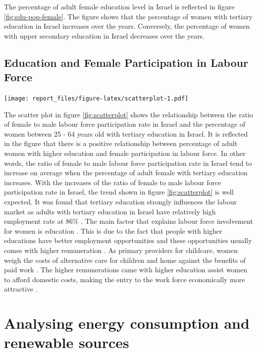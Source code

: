 \documentclass[11pt,a4paper,]{article}
\let\origfigure\figure
\let\endorigfigure\endfigure
\renewenvironment{figure}[1][2] {
    \expandafter\origfigure\expandafter[H]
} {
    \endorigfigure
}%
\begin{document}
The percentage of adult female education level in Israel is reflected in figure \ref{fig:edu-pop-female}. The figure shows that the percentage of women with tertiary education in Israel increases over the years. Conversely, the percentage of women with upper secondary education in Israel decreases over the years.

\subsection*{Education and Female Participation in Labour Force}

\begin{figure}
\centering
\texttt{[image: report\_files/figure-latex/scatterplot-1.pdf]}
\caption{\label{fig:scatterplot}Scatterplot of Female Labour Participation Ratio and Adult Women Education Level}
\end{figure}

The scatter plot in figure \ref{fig:scatterplot} shows the relationship between the ratio of female to male labour force participation rate in Israel and the percentage of women between 25 - 64 years old with tertiary education in Israel. It is reflected in the figure that there is a positive relationship between percentage of adult women with higher education and female participation in labour force. In other words, the ratio of female to male labour force participation rate in Israel tend to increase on average when the percentage of adult female with tertiary education increases. With the increases of the ratio of female to male labour force participation rate in Israel, the trend shown in figure \ref{fig:scatterplot} is well expected. It was found that tertiary education strongly influences the labour market as adults with tertiary education in Israel have relatively high employment rate at 86\% \autocite{oecd2016}. The main factor that explains labour force involvement for women is education \autocite{Stier2013}. This is due to the fact that people with higher educations have better employment opportunities and these opportunities usually comes with higher remuneration \autocite{pm2014}. As primary providers for childcare, women weigh the costs of alternative care for children and home against the benefits of paid work \autocite{Stier2013}. The higher remunerations came with higher education assist women to afford domestic costs, making the entry to the work force economically more attractive \autocite{pm2014}.

\section*{Analysing energy consumption and renewable sources}
\end{document}
